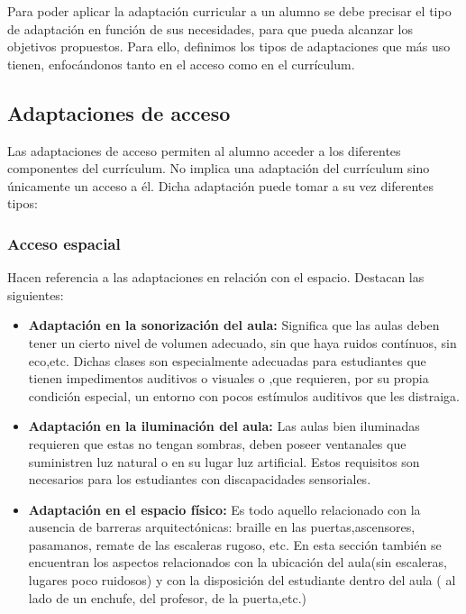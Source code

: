 Para poder aplicar la adaptación curricular a un alumno se debe precisar el tipo de adaptación en función de sus necesidades, para que pueda alcanzar los objetivos propuestos. Para ello, definimos los tipos de adaptaciones que más uso tienen, enfocándonos tanto en el acceso como en el currículum. 

\subsection{Adaptaciones de acceso}
Las adaptaciones de acceso permiten al alumno acceder a los diferentes componentes del currículum. No implica una adaptación del currículum sino únicamente un acceso a él. 
Dicha adaptación puede tomar a su vez diferentes tipos:

\subsubsection{Acceso espacial}
Hacen referencia a las adaptaciones en relación con el espacio. Destacan las siguientes:
\begin{itemize}
    \item \textbf{Adaptación en la sonorización del aula:} Significa que las aulas deben tener un cierto nivel de volumen adecuado, sin que haya ruidos contínuos, sin eco,etc. Dichas clases son especialmente adecuadas para estudiantes que tienen impedimentos auditivos o visuales o ,que requieren, por su propia condición especial, un entorno con pocos estímulos auditivos que les distraiga.
    \item \textbf{Adaptación en la iluminación del aula:} Las aulas bien iluminadas requieren que estas no tengan sombras, deben poseer ventanales que suministren luz natural o en su lugar luz artificial. Estos requisitos son necesarios para los estudiantes con discapacidades sensoriales.
    \item \textbf{Adaptación en el espacio físico:} Es todo aquello relacionado con la ausencia de barreras arquitectónicas:  braille en las puertas,ascensores, pasamanos, remate de las escaleras rugoso, etc. En esta sección también se encuentran los aspectos relacionados con la ubicación del aula(sin escaleras, lugares poco ruidosos) y con la disposición del estudiante dentro del aula ( al lado de un enchufe, del profesor, de la puerta,etc.)
\end{itemize}

